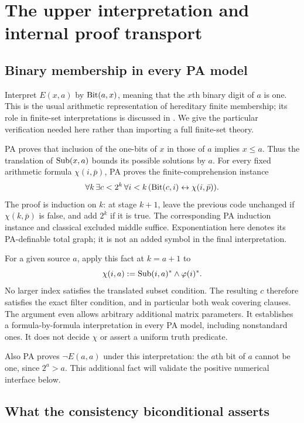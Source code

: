 \section{The upper interpretation and internal proof transport}
\label{sec:upper}

\subsection{Binary membership in every PA model}

Interpret $E(x,a)$ by $\operatorname{Bit}(a,x)$, meaning that the $x$th binary digit of $a$ is one. This is the usual arithmetic representation of hereditary finite membership; its role in finite-set interpretations is discussed in \cite{kaye-wong}. We give the particular verification needed here rather than importing a full finite-set theory.

PA proves that inclusion of the one-bits of $x$ in those of $a$ implies $x\le a$. Thus the translation of $\operatorname{Sub}(x,a)$ bounds its possible solutions by $a$. For every fixed arithmetic formula $\chi(i,\bar p)$, PA proves the finite-comprehension instance
\[
 \forall k\,\exists c<2^k\,\forall i<k\,
        (\operatorname{Bit}(c,i)\leftrightarrow\chi(i,\bar p)).
\]
The proof is induction on $k$: at stage $k+1$, leave the previous code unchanged if $\chi(k,\bar p)$ is false, and add $2^k$ if it is true. The corresponding PA induction instance and classical excluded middle suffice. Exponentiation here denotes its PA-definable total graph; it is not an added symbol in the final interpretation.

For a given source $a$, apply this fact at $k=a+1$ to
\[
        \chi(i,a):=\operatorname{Sub}(i,a)^*\land\varphi(i)^*.
\]
No larger index satisfies the translated subset condition. The resulting $c$ therefore satisfies the exact filter condition, and in particular both weak covering clauses. The argument even allows arbitrary additional matrix parameters. It establishes a formula-by-formula interpretation in every PA model, including nonstandard ones. It does not decide $\chi$ or assert a uniform truth predicate.

Also PA proves $\neg E(a,a)$ under this interpretation: the $a$th bit of $a$ cannot be one, since $2^a>a$. This additional fact will validate the positive numerical interface below.

\subsection{What the consistency biconditional asserts}

